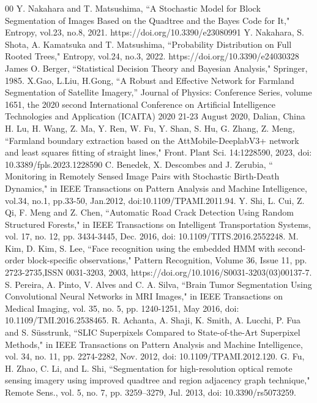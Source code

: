 \documentclass{jsarticle}
\theoremstyle{definition}
\begin{document}

\begin{thebibliography}{00}
   Y. Nakahara and T. Matsushima, ``A Stochastic Model for Block Segmentation of Images Based on the Quadtree and the Bayes Code for It," Entropy, vol.23, no.8, 2021. https://doi.org/10.3390/e23080991
   Y. Nakahara, S. Shota, A. Kamatsuka and T. Matsushima, ``Probability Distribution on Full Rooted Trees," Entropy, vol.24, no.3, 2022. https://doi.org/10.3390/e24030328
   James O. Berger, ``Statistical Decision Theory and Bayesian Analysis," Springer, 1985.
   X.Gao, L.Liu, H.Gong, ``A Robust and Effective Network for Farmland Segmentation of Satellite Imagery,” Journal of Physics: Conference Series, volume 1651, the 2020 second International Conference on Artificial Intelligence Technologies and Application (ICAITA) 2020 21-23 August 2020, Dalian, China
   H. Lu, H. Wang, Z. Ma, Y. Ren, W. Fu, Y. Shan, S. Hu, G. Zhang, Z. Meng, ``Farmland boundary extraction based on the AttMobile-DeeplabV3+ network and least squares fitting of straight lines," Front. Plant Sci. 14:1228590, 2023, doi: 10.3389/fpls.2023.1228590
   C. Benedek, X. Descombes and J. Zerubia, ``  Monitoring in  Remotely Sensed Image Pairs with Stochastic Birth-Death Dynamics," in IEEE Transactions on Pattern Analysis and Machine Intelligence, vol.34, no.1, pp.33-50, Jan.2012, doi:10.1109/TPAMI.2011.94.
   Y. Shi, L. Cui, Z. Qi, F. Meng and Z. Chen, ``Automatic Road Crack Detection Using Random Structured Forests," in IEEE Transactions on Intelligent Transportation Systems, vol. 17, no. 12, pp. 3434-3445, Dec. 2016, doi: 10.1109/TITS.2016.2552248.
   M. Kim, D. Kim, S. Lee, ``Face recognition using the embedded HMM with second-order block-specific observations," Pattern Recognition, Volume 36, Issue 11, pp. 2723-2735,ISSN 0031-3203, 2003, https://doi.org/10.1016/S0031-3203(03)00137-7.
   S. Pereira, A. Pinto, V. Alves and C. A. Silva, ``Brain Tumor Segmentation Using Convolutional Neural Networks in MRI Images," in IEEE Transactions on Medical Imaging, vol. 35, no. 5, pp. 1240-1251, May 2016, doi: 10.1109/TMI.2016.2538465.
   R. Achanta, A. Shaji, K. Smith, A. Lucchi, P. Fua and S. Süsstrunk, ``SLIC Superpixels Compared to State-of-the-Art Superpixel Methods," in IEEE Transactions on Pattern Analysis and Machine Intelligence, vol. 34, no. 11, pp. 2274-2282, Nov. 2012, doi: 10.1109/TPAMI.2012.120.
    G. Fu, H. Zhao, C. Li, and L. Shi, ``Segmentation for high-resolution optical remote sensing imagery using improved quadtree and region adjacency graph technique," Remote Sens., vol. 5, no. 7, pp. 3259–3279, Jul. 2013, doi: 10.3390/rs5073259.

\end{thebibliography}
\end{document}
